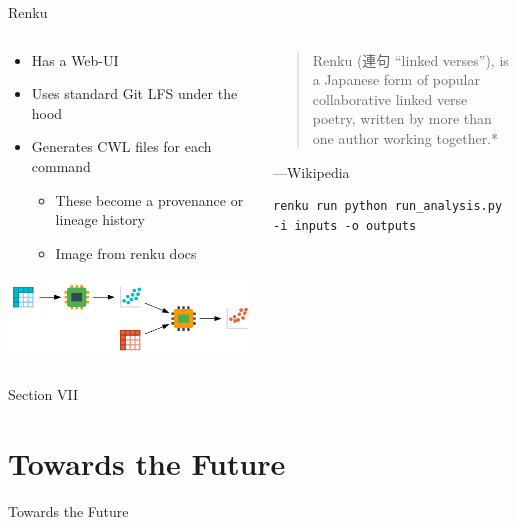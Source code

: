 \documentclass[bigger,unknownkeysallowed,aspectratio=169,red,colorblocks]{beamer}
\begin{document}
\begin{frame}[label={sec:org05f967f},fragile]{Renku}
 \begin{columns}
\begin{column}{0.6\columnwidth}
\begin{itemize}
\item Has a Web-UI
\item Uses standard Git LFS under the hood
\item Generates CWL files for each command
\begin{itemize}
\item These become a provenance or lineage history
\item Image from renku docs
\end{itemize}
\end{itemize}

\begin{center}
\includegraphics[width=.9\linewidth]{images/A_block/2020-09-20_06-55-30_screenshot.png}
\end{center}
\end{column}

\begin{column}{0.4\columnwidth}
\begin{quote}
Renku (連句 “linked verses”), is a Japanese form of popular collaborative linked verse poetry, written by more than one author working together.*
\end{quote}

—Wikipedia

\begin{verbatim}
renku run python run_analysis.py -i inputs -o outputs
\end{verbatim}
\end{column}
\end{columns}
\end{frame}
\begin{frame}[label={sec:org86cf683},standout]{Section VII}
\section{Towards the Future}
\begin{center}
  \Huge Towards the Future
\end{center}
\end{frame}
\end{document}
